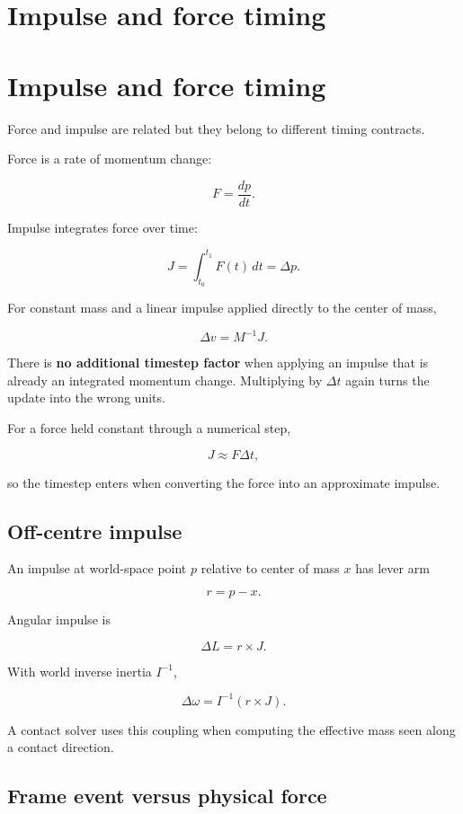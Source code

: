 \hypertarget{appendix-c39931e6e4c2}{}
\section*{Impulse and force timing}
\section{Impulse and force timing}\label{appendix-c39931e6e4c2-impulse-and-force-timing}

Force and impulse are related but they belong to different timing contracts.

Force is a rate of momentum change:

\[
F=\frac{dp}{dt}.
\]

Impulse integrates force over time:

\[
J=\int_{t_0}^{t_1}F(t)\,dt
=
\Delta p.
\]

For constant mass and a linear impulse applied directly to the center of mass,

\[
\Delta v=M^{-1}J.
\]

There is \textbf{no additional timestep factor} when applying an impulse that is already an integrated momentum change. Multiplying by \(\Delta t\) again turns the update into the wrong units.

For a force held constant through a numerical step,

\[
J\approx F\Delta t,
\]

so the timestep enters when converting the force into an approximate impulse.

\subsection{Off-centre impulse}\label{appendix-c39931e6e4c2-off-centre-impulse}

An impulse at world-space point \(p\) relative to center of mass \(x\) has lever arm

\[
r=p-x.
\]

Angular impulse is

\[
\Delta L=r\times J.
\]

With world inverse inertia \(I^{-1}\),

\[
\Delta\omega=I^{-1}(r\times J).
\]

A contact solver uses this coupling when computing the effective mass seen along a contact direction.

\subsection{Frame event versus physical force}\label{appendix-c39931e6e4c2-frame-event-versus-physical-force}

